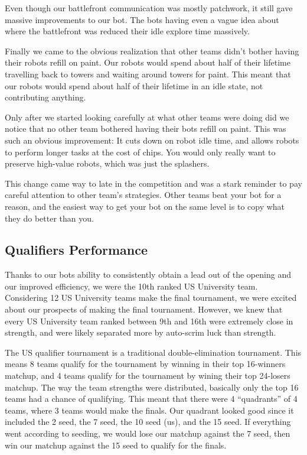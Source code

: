 \medskip

Even though our battlefront communication was mostly patchwork, it still gave massive improvements to our bot. The bots having even a vague idea about where the battlefront was reduced their idle explore time massively.

\medskip

Finally we came to the obvious realization that other teams didn't bother having their robots refill on paint. Our robots would spend about half of their lifetime travelling back to towers and waiting around towers for paint. This meant that our robots would spend about half of their lifetime in an idle state, not contributing anything.

\medskip

Only after we started looking carefully at what other teams were doing did we notice that no other team bothered having their bots refill on paint. This was such an obvious improvement: It cuts down on robot idle time, and allows robots to perform longer tasks at the cost of chips. You would only really want to preserve high-value robots, which was just the splashers.

\medskip

This change came way to late in the competition and was a stark reminder to pay careful attention to other team's strategies. Other teams beat your bot for a reason, and the easiest way to get your bot on the same level is to copy what they do better than you.

\subsection{Qualifiers Performance}

Thanks to our bots ability to consistently obtain a lead out of the opening and our improved efficiency, we were the 10th ranked US University team. Considering 12 US University teams make the final tournament, we were excited about our prospects of making the final tournament. However, we knew that every US University team ranked between 9th and 16th were extremely close in strength, and were likely separated more by auto-scrim luck than strength.

\medskip

The US qualifier tournament is a traditional double-elimination tournament. This means 8 teams qualify for the tournament by winning in their top 16-winners matchup, and 4 teams qualify for the tournament by wining their top 24-losers matchup. The way the team strengths were distributed, basically only the top 16 teams had a chance of qualifying. This meant that there were 4 ``quadrants'' of 4 teams, where 3 teams would make the finals. Our quadrant looked good since it included the 2 seed, the 7 seed, the 10 seed (us), and the 15 seed. If everything went according to seeding, we would lose our matchup against the 7 seed, then win our matchup against the 15 seed to qualify for the finals.

